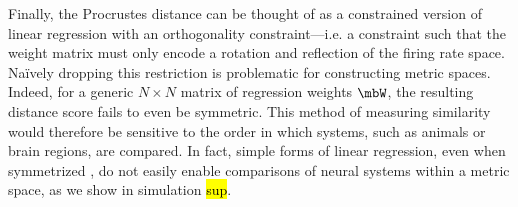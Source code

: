 


Finally, the Procrustes distance can be thought of as a constrained version of linear regression with an orthogonality constraint---i.e. a constraint such that the weight matrix must only encode a rotation and reflection of the firing rate space. Na\"ively dropping this restriction is problematic for constructing metric spaces. Indeed, for a generic $N \times N$ matrix of regression weights $\mbW$, the resulting distance score fails to even be symmetric.
This method of measuring similarity would therefore be sensitive to the order in which systems, such as animals or brain regions, are compared. In fact, simple forms of linear regression, even when symmetrized \parencite{muzellec2026reverse}, do not easily enable comparisons of neural systems within a metric space, as we show in simulation \hl{sup}.

